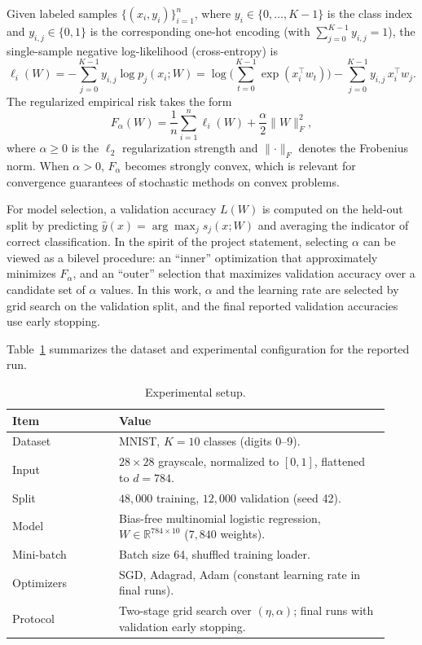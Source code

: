\documentclass[11pt]{article}
\numberwithin{equation}{section}
\numberwithin{table}{section}
\numberwithin{figure}{section}
\numberwithin{algorithm}{section}
\begin{document}
Given labeled samples \(\{(x_i,y_i)\}_{i=1}^n\), where \(y_i\in\{0,\dots,K-1\}\) is the class index and \(y_{i,j}\in\{0,1\}\) is the corresponding one-hot encoding (with \(\sum_{j=0}^{K-1} y_{i,j}=1\)), the single-sample negative log-likelihood (cross-entropy) is
\begin{equation}
\ell_i(W)=-\sum_{j=0}^{K-1} y_{i,j}\log p_j(x_i;W)
=\log\!\Big(\sum_{t=0}^{K-1}\exp(x_i^\top w_t)\Big)-\sum_{j=0}^{K-1}y_{i,j}\,x_i^\top w_j.
\label{eq:sampleloss}
\end{equation}
The regularized empirical risk takes the form
\begin{equation}
F_\alpha(W)=\frac{1}{n}\sum_{i=1}^{n}\ell_i(W)+\frac{\alpha}{2}\lVert W\rVert_F^2,
\label{eq:objective}
\end{equation}
where \(\alpha\ge 0\) is the \(\ell_2\) regularization strength and \(\lVert\cdot\rVert_F\) denotes the Frobenius norm. When \(\alpha>0\), \(F_\alpha\) becomes strongly convex, which is relevant for convergence guarantees of stochastic methods on convex problems.

For model selection, a validation accuracy \(L(W)\) is computed on the held-out split by predicting \(\hat{y}(x)=\arg\max_j s_j(x;W)\) and averaging the indicator of correct classification. In the spirit of the project statement, selecting \(\alpha\) can be viewed as a bilevel procedure: an ``inner'' optimization that approximately minimizes \(F_\alpha\), and an ``outer'' selection that maximizes validation accuracy over a candidate set of \(\alpha\) values. In this work, \(\alpha\) and the learning rate are selected by grid search on the validation split, and the final reported validation accuracies use early stopping.

Table~\ref{tab:setup} summarizes the dataset and experimental configuration for the reported run.
\begin{table}[H]
\caption{Experimental setup.}
\label{tab:setup}
\centering
\begin{tabular}{@{}>{\raggedright\arraybackslash}p{0.26\linewidth}p{0.66\linewidth}@{}}
\toprule
\textbf{Item} & \textbf{Value} \\
\midrule
Dataset & MNIST, \(K=10\) classes (digits 0--9). \\
Input & \(28\times 28\) grayscale, normalized to \([0,1]\), flattened to \(d=784\). \\
Split & \(48{,}000\) training, \(12{,}000\) validation (seed 42). \\
Model & Bias-free multinomial logistic regression, \(W\in\mathbb{R}^{784\times 10}\) (\(7{,}840\) weights). \\
Mini-batch & Batch size 64, shuffled training loader. \\
Optimizers & SGD, Adagrad, Adam (constant learning rate in final runs). \\
Protocol & Two-stage grid search over \((\eta,\alpha)\); final runs with validation early stopping. \\
\bottomrule
\end{tabular}
\end{table}
\end{document}
